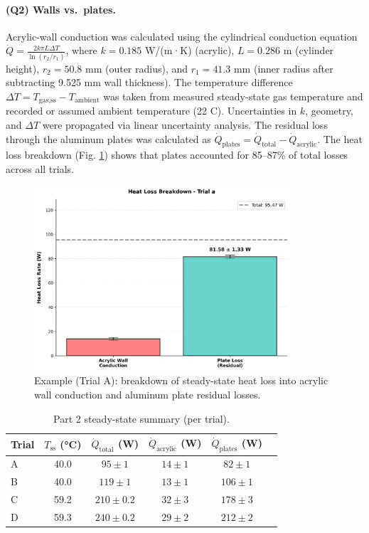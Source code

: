 \documentclass[12pt]{article}
\begin{document}
\paragraph{(Q2) Walls vs.\ plates.} Acrylic-wall conduction was calculated using the cylindrical conduction equation $\dot{Q} = \frac{2k\pi L\Delta T}{\ln(r_2/r_1)}$, where $k = 0.185$ W/(m·K) (acrylic), $L = 0.286$ m (cylinder height), $r_2 = 50.8$ mm (outer radius), and $r_1 = 41.3$ mm (inner radius after subtracting 9.525 mm wall thickness). The temperature difference $\Delta T = T_{\text{gas,ss}} - T_{\text{ambient}}$ was taken from measured steady-state gas temperature and recorded or assumed ambient temperature (22 \textdegree C). Uncertainties in $k$, geometry, and $\Delta T$ were propagated via linear uncertainty analysis. The residual loss through the aluminum plates was calculated as $\dot{Q}_{\text{plates}} = \dot{Q}_{\text{total}} - \dot{Q}_{\text{acrylic}}$. The heat loss breakdown (Fig. \ref{fig:part2_breakdown}) shows that plates accounted for 85–87\% of total losses across all trials.

\begin{figure}[H]
\centering
\includegraphics[width=0.85\textwidth]{graphs/part2_trial_a_loss_breakdown.png}
\caption{Example (Trial A): breakdown of steady-state heat loss into acrylic wall conduction and aluminum plate residual losses.}
\label{fig:part2_breakdown}
\end{figure}

\begin{table}[H]\centering
\caption{Part 2 steady-state summary (per trial).}
\label{tab:part2}
\begin{tabular}{@{}lccccc@{}}
\toprule
Trial & $T_{\text{ss}}$ (\si{\celsius}) & $\dot Q_{\text{total}}$ (W) & $\dot Q_{\text{acrylic}}$ (W) & $\dot Q_{\text{plates}}$ (W) \\
\midrule
A & 40.0 & $95 \pm 1$ & $14 \pm 1$ & $82 \pm 1$ \\
B & 40.0 & $119 \pm 1$ & $13 \pm 1$ & $106 \pm 1$ \\
C & 59.2 & $210 \pm 0.2$ & $32 \pm 3$ & $178 \pm 3$ \\
D & 59.3 & $240 \pm 0.2$ & $29 \pm 2$ & $212 \pm 2$ \\
\bottomrule
\end{tabular}
\end{table}
\end{document}
